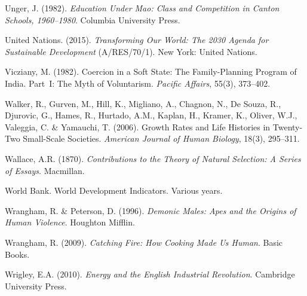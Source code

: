 \documentclass[12pt,letterpaper]{article}
\begin{document}
Unger, J. (1982). \emph{Education Under Mao: Class and Competition in
Canton Schools, 1960--1980}. Columbia University Press.

United Nations. (2015). \emph{Transforming Our World: The 2030 Agenda
for Sustainable Development} (A/RES/70/1). New York: United Nations.

Vicziany, M. (1982). Coercion in a Soft State: The Family-Planning
Program of India. Part~I: The Myth of Voluntarism. \emph{Pacific
Affairs}, 55(3), 373--402.

Walker, R., Gurven, M., Hill, K., Migliano, A., Chagnon, N., De
Souza, R., Djurovic, G., Hames, R., Hurtado, A.M., Kaplan, H.,
Kramer, K., Oliver, W.J., Valeggia, C. \& Yamauchi, T. (2006). Growth
Rates and Life Histories in Twenty-Two Small-Scale Societies.
\emph{American Journal of Human Biology}, 18(3), 295--311.

Wallace, A.R. (1870). \emph{Contributions to the Theory of Natural
Selection: A Series of Essays}. Macmillan.

World Bank. World Development Indicators. Various years.

Wrangham, R. \& Peterson, D. (1996). \emph{Demonic Males: Apes and
the Origins of Human Violence}. Houghton Mifflin.

Wrangham, R. (2009). \emph{Catching Fire: How Cooking Made Us Human}.
Basic Books.

Wrigley, E.A. (2010). \emph{Energy and the English Industrial
Revolution}. Cambridge University Press.
\end{document}
